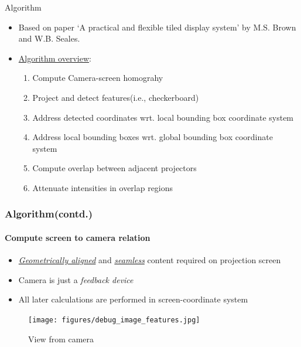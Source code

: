 \documentclass{beamer}
\begin{document}
\begin{frame}{Algorithm}
\begin{itemize}
\item Based on paper `A practical and flexible tiled
display system' by M.S. Brown and W.B. Seales.
\item \underline{Algorithm overview}:
\begin{enumerate}
\item Compute Camera-screen homograhy
\item Project and detect features(i.e., checkerboard)
\item Address detected coordinates wrt. local bounding box coordinate system 
\item Address local bounding boxes wrt. global bounding box coordinate system
\item Compute overlap between adjacent projectors
\item Attenuate intensities in overlap regions
\end{enumerate}
\end{itemize}
\end{frame}


\begin{frame}
\frametitle{Algorithm(contd.)}
\framesubtitle{Compute screen to camera relation}
\begin{itemize}
\item \hyperlink{concept}{\textit{Geometrically aligned}} and \hyperlink{concept}{\textit{seamless}} content required on projection screen
\item Camera is just a \textit{feedback device}
\item All later calculations are performed in screen-coordinate system
\end{itemize}

\begin{figure}
\texttt{[image: figures/debug\_image\_features.jpg]}
\caption{View from camera}
\end{figure}
\end{frame}

\end{document}
